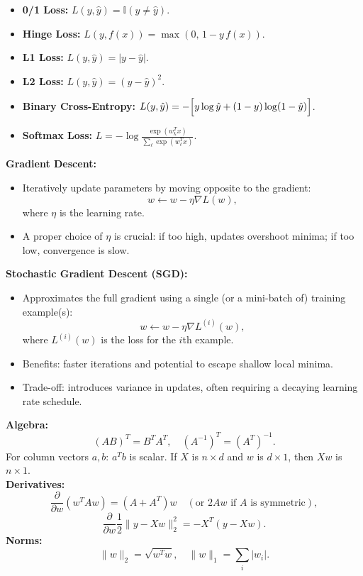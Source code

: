 \documentclass[10pt,landscape]{article}
\begin{document}
\begin{multicols}{3}
\begin{tcolorbox}[breakable, title=Loss Functions]
\begin{itemize}[noitemsep, topsep=0pt]
  \item \textbf{0/1 Loss:} \(L(y,\hat{y})=\mathbb{I}(y\neq\hat{y})\).
  \item \textbf{Hinge Loss:} \(L(y,f(x))=\max(0,\,1-y\,f(x))\).
  \item \textbf{L1 Loss:} \(L(y,\hat{y})=|y-\hat{y}|\).
  \item \textbf{L2 Loss:} \(L(y,\hat{y})=(y-\hat{y})^2\).
  \item \textbf{Binary Cross-Entropy:} \(L(y,\hat{y})=-\Bigl[y\log\hat{y}+(1-y)\log(1-\hat{y})\Bigr]\).
  \item \textbf{Softmax Loss:} \(L=-\log\frac{\exp(w_k^T x)}{\sum_\ell \exp(w_\ell^T x)}\).
\end{itemize}
\end{tcolorbox}

\begin{tcolorbox}[breakable, title=Gradient Descent]
\textbf{Gradient Descent:}
\begin{itemize}[noitemsep, topsep=0pt]
  \item Iteratively update parameters by moving opposite to the gradient:
  \[
  w \leftarrow w - \eta \nabla L(w),
  \]
  where \(\eta\) is the learning rate.
  \item A proper choice of \(\eta\) is crucial: if too high, updates overshoot minima; if too low, convergence is slow.
\end{itemize}
\textbf{Stochastic Gradient Descent (SGD):}
\begin{itemize}[noitemsep, topsep=0pt]
  \item Approximates the full gradient using a single (or a mini-batch of) training example(s):
  \[
  w \leftarrow w - \eta \nabla L^{(i)}(w),
  \]
  where \(L^{(i)}(w)\) is the loss for the \(i\)th example.
  \item Benefits: faster iterations and potential to escape shallow local minima.
  \item Trade-off: introduces variance in updates, often requiring a decaying learning rate schedule.
\end{itemize}
\end{tcolorbox}

\begin{tcolorbox}[breakable, title=Matrix Rules]
\textbf{Algebra:}
\[
(AB)^T=B^TA^T,\quad (A^{-1})^T=(A^T)^{-1}.
\]
For column vectors \(a,b\): \(a^T b\) is scalar. If \(X\) is \(n\times d\) and \(w\) is \(d\times1\), then \(Xw\) is \(n\times1\).\\[1mm]
\textbf{Derivatives:}
\[
\frac{\partial}{\partial w}(w^TAw)=(A+A^T)w\quad (\text{or }2Aw \text{ if }A\text{ is symmetric}),
\]
\[
\frac{\partial}{\partial w}\frac{1}{2}\|y-Xw\|_2^2=-X^T(y-Xw).
\]
\textbf{Norms:}
\[
\|w\|_2=\sqrt{w^Tw},\quad \|w\|_1=\sum_i|w_i|.
\]
\end{tcolorbox}


\end{multicols}
\end{document}
